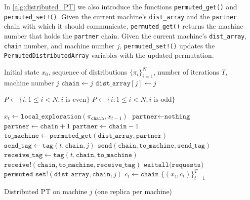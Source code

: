 \medskip 
In \cref{alg:distributed_PT} we also introduce the functions 
\texttt{permuted\_get()} and \texttt{permuted\_set!()}. 
Given the current machine's \texttt{dist\_array} and the 
\texttt{partner} chain with which it should communicate, 
\texttt{permuted\_get()} returns the machine number that holds the \texttt{partner} chain. 
Given the current machine's \texttt{dist\_array}, \texttt{chain} number, and machine number $j$,
\texttt{permuted\_set!()} updates the \texttt{PermutedDistributedArray} variables 
with the updated permutation.

\begin{algorithm}[t]
	\begin{algorithmic}[1]
    \Require Initial state $x_0$, sequence of distributions $\{\pi_i\}_{i=1}^N$, 
      number of iterations $T$, machine number $j$
    \State $\texttt{chain} \gets j$ 
    \State $\texttt{dist\_array}[j] \gets j$ 
		
		   
		    \State $P \gets \{i: 1 \le i < N, i \text{ is even} \}$
		  \Else
		    \State $P \gets \{i: 1 \le i < N, i \text{ is odd} \}$
		  \EndIf

      \State $x_t \gets \texttt{local\_exploration}(\pi_\texttt{chain}, x_{t-1})$
      \State $\texttt{partner} \gets \texttt{nothing}$
        \State $\texttt{partner} \gets \texttt{chain}+1$
        \State $\texttt{partner} \gets \texttt{chain}-1$
      \EndIf
        \State $\texttt{to\_machine} \gets \texttt{permuted\_get}(\texttt{dist\_array}, \texttt{partner})$
        \State $\texttt{send\_tag} \gets \texttt{tag}(t, \texttt{chain}, j)$
        \State $\texttt{send}(\texttt{chain}, \texttt{to\_machine}, \texttt{send\_tag})$
        \State $\texttt{receive\_tag} \gets \texttt{tag}(t, \texttt{chain}, \texttt{to\_machine})$
        \State $\texttt{receive!}(\texttt{chain}, \texttt{to\_machine}, \texttt{receive\_tag})$
        \State $\texttt{waitall(requests)}$ 
        \State $\texttt{permuted\_set!}(\texttt{dist\_array}, \texttt{chain}, j)$
      \EndIf
      \State $c_t \gets \texttt{chain}$ 
		\EndFor
    \State \Return $\{(x_t, c_t)\}_{t=1}^T$
	\end{algorithmic}
  \caption{Distributed PT on machine $j$ (one replica per machine)}
  \label{alg:distributed_PT}
\end{algorithm}


